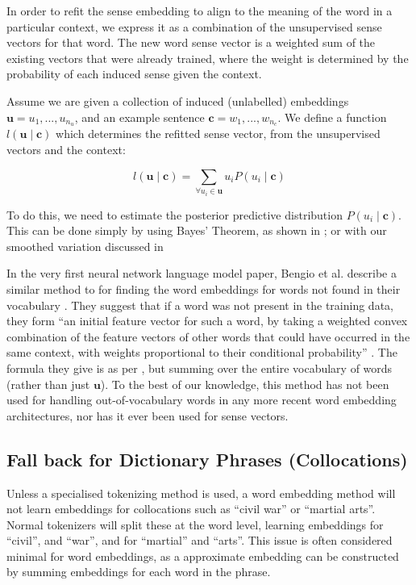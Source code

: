 \documentclass{sig-alternate}
\renewcommand{\c}{\mathbf{c}}
\renewcommand{\u}{\mathbf{u}}
\begin{document}
In order to refit the sense embedding to align to the meaning of the word in a particular context, we express it as a combination of the unsupervised sense vectors for that word.
The new word sense vector is a weighted sum of the existing vectors that were already trained, where the weight is determined by the probability of each induced sense given the context.


Assume we are given a collection of induced (unlabelled) embeddings $\u={u_1,...,u_{n_u}}$, and an example sentence $\c={w_1,...,w_{n_c}}$. We define a function $l(\u \mid \c )$ which determines the refitted sense vector, from the unsupervised vectors and the context:

\begin{equation} \label{eq:synth}
l(\u \mid \c ) = \sum_{\forall u_i \in \u} u_i P(u_i \mid \c)
\end{equation}

To do this, we need to estimate the posterior predictive distribution $P(u_i \mid \c)$.
This can be done simply by using Bayes' Theorem, as shown in ; or with our smoothed variation discussed in 


In the very first neural network language model paper, Bengio et al. describe a similar method to  for finding the word embeddings for words not found in their vocabulary \parencite{NPLM}. They suggest that if a word was not present in the training data, they form \enquote{an initial feature vector for such a word, by taking a weighted convex combination of the feature vectors of other words that could have occurred in the same context, with weights proportional to their conditional probability} \parencite{NPLM}. The formula they give is as per , but summing over the entire vocabulary of words (rather than just $\u$). To the best of our knowledge, this method has not been used for handling out-of-vocabulary words in any more recent word embedding architectures, nor has it ever been used for sense vectors.


\subsection {Fall back for Dictionary Phrases (Collocations)}
Unless a specialised tokenizing method is used, a word embedding method will not learn embeddings for collocations such as ``civil war'' or ``martial arts''. Normal tokenizers will split these at the word level, learning embeddings for ``civil'', and ``war'', and for ``martial'' and ``arts''. This issue is often considered minimal for word embeddings, as a approximate embedding can be constructed by summing embeddings for each word in the phrase.
\end{document}
